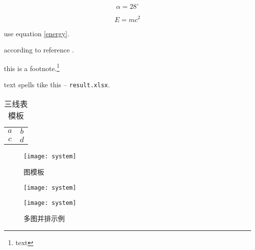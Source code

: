 \documentclass{cumcmthesis}
\begin{document}
	\subsubsection{}


	
	\[					%
	\alpha=28^\circ		%
	\]
	
	
	
	\begin{equation}	%
		E=mc^2
		\label{energy}
	\end{equation}  \par 

	
	
	use equation \cref{energy}.   \par    %
	
	
	
	according to reference \cite{bib:one}.    \par    %
	
	
	
	this is a footnote.\footnote{text}  \par      %
	
	
	
	text spells tike this -- \texttt{result.xlsx}.   %
	
	
	
	\begin{table}[H]   %
		\begin{center}
			\begin{tabular}{cc}
				\hline
				\makebox[0.4\textwidth][c]{$key$} &
				\makebox[0.4\textwidth][c]{$value$} \\ \hline
				$a$   &   $b$ \\
				$c$   &   $d$ \\  \hline
			\end{tabular}
		\end{center}
		\caption{三线表模板}
	\end{table}
	
	
	
	\begin{figure}[H]   %
		\centering
		\texttt{[image: system]}
		\caption{图模板}
		\label{system}
	\end{figure}
	
	
	
	\begin{figure}[H]   %
		\centering
		\begin{minipage}[c]{0.4\textwidth}
			\centering
			\texttt{[image: system]}
			\label{fig:sample-figure-a}
		\end{minipage}
		\begin{minipage}[c]{0.4\textwidth}
			\centering
			\texttt{[image: system]}
			\label{fig:sample-figure-b}
		\end{minipage}
		\caption{多图并排示例}
		\label{fig:sample-figure}
	\end{figure}
	
\end{document}
